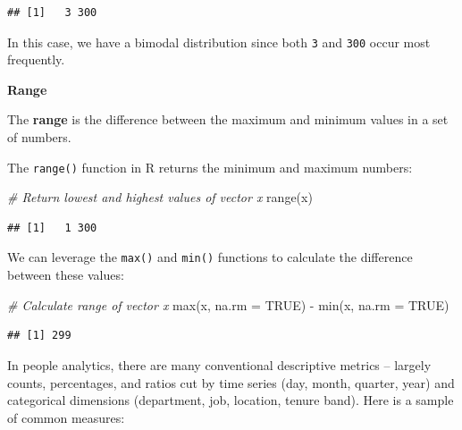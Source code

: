 \documentclass[
]{book}
\newenvironment{Shaded}{\begin{snugshade}}{\end{snugshade}}
\newcommand{\AttributeTok}[1]{\textcolor[rgb]{0.77,0.63,0.00}{#1}}
\newcommand{\CommentTok}[1]{\textcolor[rgb]{0.56,0.35,0.01}{\textit{#1}}}
\newcommand{\ConstantTok}[1]{\textcolor[rgb]{0.00,0.00,0.00}{#1}}
\newcommand{\FunctionTok}[1]{\textcolor[rgb]{0.00,0.00,0.00}{#1}}
\newcommand{\NormalTok}[1]{#1}
\newcommand{\SpecialCharTok}[1]{\textcolor[rgb]{0.00,0.00,0.00}{#1}}
\begin{document}
\begin{verbatim}
## [1]   3 300
\end{verbatim}

In this case, we have a bimodal distribution since both \texttt{3} and \texttt{300} occur most frequently.

\textbf{Range}

The \textbf{range} is the difference between the maximum and minimum values in a set of numbers.

The \texttt{range()} function in R returns the minimum and maximum numbers:

\begin{Shaded}
\begin{Highlighting}[]
\CommentTok{\# Return lowest and highest values of vector x}
\FunctionTok{range}\NormalTok{(x)}
\end{Highlighting}
\end{Shaded}

\begin{verbatim}
## [1]   1 300
\end{verbatim}

We can leverage the \texttt{max()} and \texttt{min()} functions to calculate the difference between these values:

\begin{Shaded}
\begin{Highlighting}[]
\CommentTok{\# Calculate range of vector x}
\FunctionTok{max}\NormalTok{(x, }\AttributeTok{na.rm =} \ConstantTok{TRUE}\NormalTok{) }\SpecialCharTok{{-}} \FunctionTok{min}\NormalTok{(x, }\AttributeTok{na.rm =} \ConstantTok{TRUE}\NormalTok{)}
\end{Highlighting}
\end{Shaded}

\begin{verbatim}
## [1] 299
\end{verbatim}

In people analytics, there are many conventional descriptive metrics -- largely counts, percentages, and ratios cut by time series (day, month, quarter, year) and categorical dimensions (department, job, location, tenure band). Here is a sample of common measures:
\end{document}

